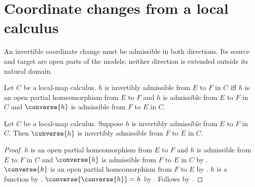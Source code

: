 \section{Coordinate changes from a local calculus}





An invertible coordinate change must be admissible in both directions.
Its source and target are open parts of the models; neither direction is
extended outside its natural domain.

\begin{definition}\label{invertibly_admissible}
    Let $C$ be a local-map calculus.
    $h$ is invertibly admissible from $E$ to $F$ in $C$ iff
        $h$ is an open partial homeomorphism from $E$ to $F$ and
        $h$ is admissible from $E$ to $F$ in $C$ and
        $\converse{h}$ is admissible from $F$ to $E$ in $C$.
\end{definition}

\begin{theorem}\label{invertibly_admissible_converse}
    Let $C$ be a local-map calculus.
    Suppose $h$ is invertibly admissible from $E$ to $F$ in $C$.
    Then $\converse{h}$ is invertibly admissible from $F$ to $E$ in $C$.
\end{theorem}
\begin{proof}
    $h$ is an open partial homeomorphism from $E$ to $F$ and
        $h$ is admissible from $E$ to $F$ in $C$ and
        $\converse{h}$ is admissible from $F$ to $E$ in $C$ by
        .
    $\converse{h}$ is an open partial homeomorphism from $F$ to $E$ by
        .
    $h$ is a function by .
    $\converse{\converse{h}}=h$ by .
    Follows by .
\end{proof}

